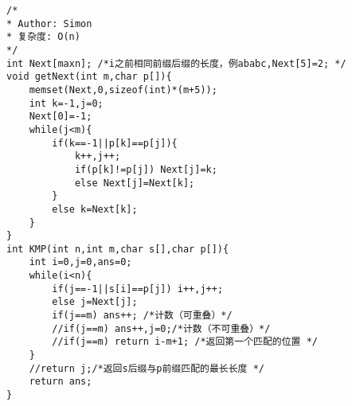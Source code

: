 \begin{lstlisting}
/*
* Author: Simon
* 复杂度: O(n)
*/
int Next[maxn]; /*i之前相同前缀后缀的长度，例ababc,Next[5]=2; */
void getNext(int m,char p[]){
	memset(Next,0,sizeof(int)*(m+5));
	int k=-1,j=0;
	Next[0]=-1;
	while(j<m){
		if(k==-1||p[k]==p[j]){
			k++,j++;
			if(p[k]!=p[j]) Next[j]=k;
			else Next[j]=Next[k];
		}
		else k=Next[k];
	}
}
int KMP(int n,int m,char s[],char p[]){
	int i=0,j=0,ans=0;
	while(i<n){
		if(j==-1||s[i]==p[j]) i++,j++;
		else j=Next[j];
		if(j==m) ans++; /*计数（可重叠）*/
		//if(j==m) ans++,j=0;/*计数（不可重叠）*/
		//if(j==m) return i-m+1; /*返回第一个匹配的位置 */
	}
	//return j;/*返回s后缀与p前缀匹配的最长长度 */
	return ans;
}
\end{lstlisting}